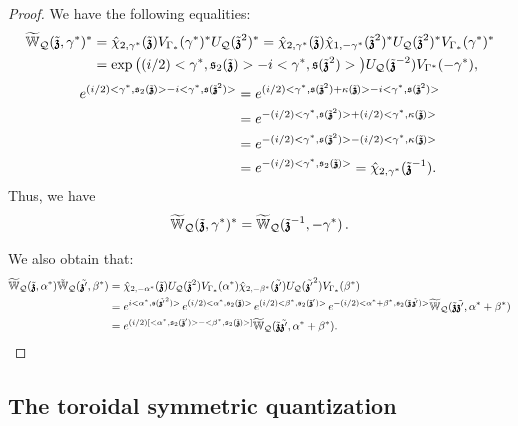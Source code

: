\documentclass[12pt]{article}
\theoremstyle{definition}
\def\T{\mathcal{Q}}
\def\s{\mathfrak{s}}
\def\bz{\mathfrak{z}\hspace*{-4pt}\mathfrak{z}}
\numberwithin{equation}{section}
\begin{document}
\begin{proof}
We have the following equalities:
\begin{align*}
	\widetilde{\mathbb{W}}_{\T}(\tilde{\bz},\gamma^*)^*&=\hat{\chi}_{2,\gamma^*}(\tilde{\bz})V_{\Gamma_*}(\gamma^*)^*U_{\T}(\tilde{\bz}^{2})^*=\hat{\chi}_{2,\gamma^*}(\tilde{\bz})\hat{\chi}_{1,-\gamma^*}(\tilde{\bz}^{2})^*U_{\T}(\tilde{\bz}^{2})^*V_{\Gamma_*}(\gamma^*)^*\\
	&=\exp\big((i/2)<\gamma^*,\s_2(\tilde{\bz})>-i<\gamma^*,\s(\tilde{\bz}^2)>\big)U_{\T}(\tilde{\bz}^{-2})V_{\Gamma^*}(-\gamma^*),
\end{align*}
\begin{align*}
e^{(i/2)<\gamma^*,\s_2(\tilde{\bz})>-i<\gamma^*,\s(\tilde{\bz}^2)>}&=e^{(i/2)<\gamma^*,\s(\tilde{\bz}^2)+\kappa(\tilde{\bz})>-i<\gamma^*,\s(\tilde{\bz}^2)>}\\
&=e^{-(i/2)<\gamma^*,\s(\tilde{\bz}^2)>+(i/2)<\gamma^*,\kappa(\tilde{\bz})>}\\
&=e^{-(i/2)<\gamma^*,\s(\tilde{\bz}^2)>-(i/2)<\gamma^*,\kappa(\tilde{\bz})>}\\
&=e^{-(i/2)<\gamma^*,\s_2(\tilde{\bz})>}=\hat{\chi}_{2,\gamma^*}(\tilde{\bz}^{-1}).
\end{align*}
Thus, we have $$\widetilde{\mathbb{W}}_{\T}(\tilde{\bz},\gamma^*)^*=\widetilde{\mathbb{W}}_{\T}(\tilde{\bz}^{-1},-\gamma^*)\,.$$

We also obtain that:
\begin{align*}
	\widetilde{\mathbb{W}}_{\T}(\tilde{\bz},\alpha^*)\tilde{\mathbb{W}}_{\T}(\tilde{\bz'},\beta^*)&=\hat{\chi}_{2,-\alpha^*}(\tilde{\bz})U_{\T}(\tilde{\bz}^2)V_{\Gamma_*}(\alpha^*)\hat{\chi}_{2,-\beta^*}(\tilde{\bz'})U_{\T}(\tilde{\bz'}^2)V_{\Gamma_*}(\beta^*)\\ \nonumber
&=e^{i<\alpha^*,\s(\tilde{\bz'}^2)>}\,e^{(i/2)<\alpha^*,\s_2(\tilde{\bz})>}\,e^{(i/2)<\beta^*,\s_2(\tilde{\bz}')>}\,e^{-(i/2)<\alpha^*+\beta^*,\s_2(\tilde{\bz}\,\tilde{\bz'})>}\widetilde{\mathbb{W}}_{\T}(\tilde{\bz}\tilde{\bz'},\alpha^*+\beta^*)\\ \nonumber
	&=e^{(i/2)[<\alpha^*,\s_2(\tilde{\bz}')>-<\beta^*,\s_2(\tilde{\bz})>]}\widetilde{\mathbb{W}}_{\T}(\tilde{\bz}\tilde{\bz'},\alpha^*+\beta^*).
\end{align*}
\end{proof}

\subsection{The toroidal symmetric quantization}
\end{document}

